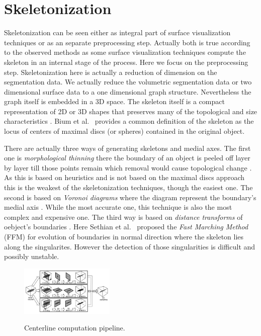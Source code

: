 \section{Skeletonization}

Skeletonization can be seen either as integral part of surface visualization techniques or as an separate preprocessing step. Actually both is true according to the observed methods as some surface visualization techniques compute the skeleton in an internal stage of the process. Here we focus on the preprocessing step.
Skeletonization here is actually a reduction of dimension on the segmentation data. We actually reduce the volumetric segmentation data or two dimensional surface data to a one dimensional graph structure. Nevertheless the graph itself is embedded in a 3D space.
The skeleton itself is a compact representation of 2D or 3D shapes that preserves many of the topological and size characteristics \cite{alexandru2002augmented}. Bium et al.~\cite{bium1964transformation} provides a common definition of the skeleton as the locus of centers of maximal discs (or spheres) contained in the original object.

There are actually three ways of generating skeletons and medial axes. The first one is \emph{morphological thinning} there the boundary of an object is peeled off layer by layer till those points remain which removal would cause topological change \cite{alexandru2002augmented}. As this is based on heuristics and is not based on the maximal discs approach this is the weakest of the skeletonization techniques, though the easiest one. The second is based on \emph{Voronoi diagrams} where the diagram represent the boundary's medial axis \cite{alexandru2002augmented}. While the most accurate one, this technique is also the most complex and expensive one. The third way is based on \emph{distance transforms} of oebject's boundaries \cite{alexandru2002augmented}. Here Sethian et al.~\cite{sethian1996fast} proposed the \emph{Fast Marching Method} (FFM) for evolution of boundaries in normal direction where the skeleton lies along the singularites. However the detection of those singularities is difficult and possibly unstable.

\begin{figure}[h]
	\centering
	\includegraphics[width=0.4\textwidth]{./Images/CenterlineComputation.png} \\
	\caption{Centerline computation pipeline.}
	\cite{alexandru2002augmented}
	\label{fig:CenterlineComputation}
\end{figure} 

